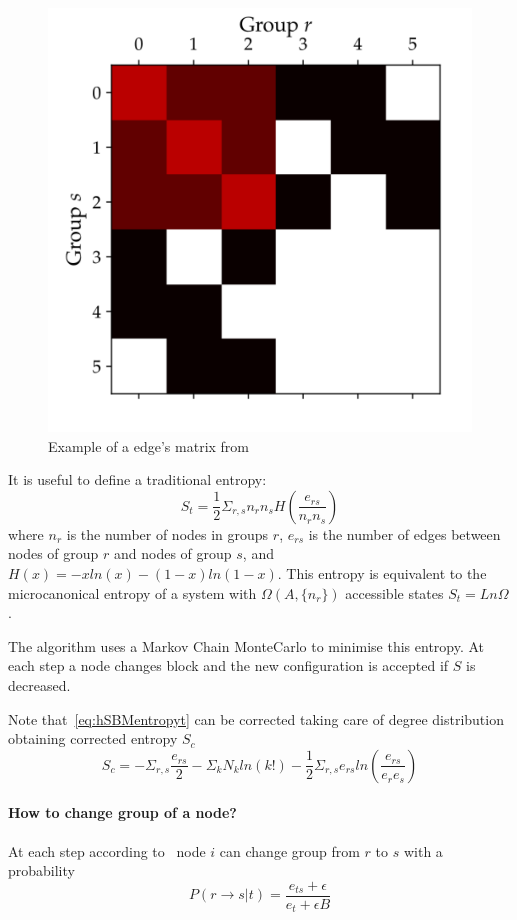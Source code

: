 \begin{figure}
  \centering
  \includegraphics[width=0.3\linewidth]{pictures/topic/topic__pixioto_ers.pdf}
  \caption{Example of a edge's matrix from~\cite{peixoto_graph-tool_2014}}
    \label{fig:hsbm-ers}
\end{figure}

It is useful to define a traditional entropy:
\begin{equation}\label{eq:hSBMentropyt}
  S_t=\frac{1}{2}\Sigma_{r,s} n_rn_sH\left(\frac{e_{rs}}{n_rn_s}\right)
\end{equation}
where $n_{r}$ is the number of nodes in groups $r$, $e_{rs}$ is the
number of edges between nodes of group $r$ and nodes of group $s$, and
$H(x)=-xln(x)-(1-x)ln(1-x)$. This entropy is equivalent to the microcanonical
entropy of a system with ${\Omega(A,\{n_r\})}$ accessible states $S_t=Ln\Omega$.

The algorithm uses a Markov Chain MonteCarlo to minimise this entropy.
At each step a node changes block and the new configuration is accepted if $S$ is decreased.

Note that~\ref{eq:hSBMentropyt} can be corrected taking care of degree
distribution obtaining corrected entropy $S_c$
\begin{equation}
  S_c=-\Sigma_{r,s}\frac{e_{rs}}{2}-\Sigma_k
  N_kln(k!)-\frac{1}{2}\Sigma_{r,s}e_{rs}ln\left(\frac{e_{rs}}{e_re_s}\right)
\end{equation}

\paragraph{How to change group of a node?}
At each step according to~\cite{peixoto2014efficient} node $i$ can change group from $r$ to $s$ with a probability
\begin{equation}\label{eq:Prst}
  P(r\to s|t)=\frac{e_{ts}+\epsilon}{e_t+\epsilon B}
\end{equation}

